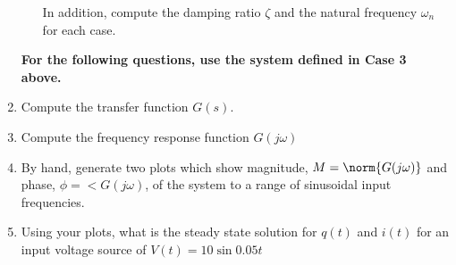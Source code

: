 \documentclass[11pt, reqno]{article}    %
\begin{document}
\begin{enumerate}
\begin{enumerate}
        In addition, compute the damping ratio \( \zeta \) and the natural frequency \( \omega_n \) for each case.
    \end{enumerate}
    \textbf{For the following questions, use the system defined in Case 3 above.}
    \item Compute the transfer function \( G(s) \). 
    \item Compute the frequency response function \( G(j \omega)\)
    \item By hand, generate two plots which show magnitude, \( M = \norm{G(j\omega)}\) and phase, \( \phi = < G(j\omega)\), of the system to a range of sinusoidal input frequencies.
    \item Using your plots, what is the steady state solution for \( q(t) \) and \( i(t) \) for an input voltage source of \( V(t) = 10 \sin{0.05 t}\)
\end{enumerate}
\end{document}
